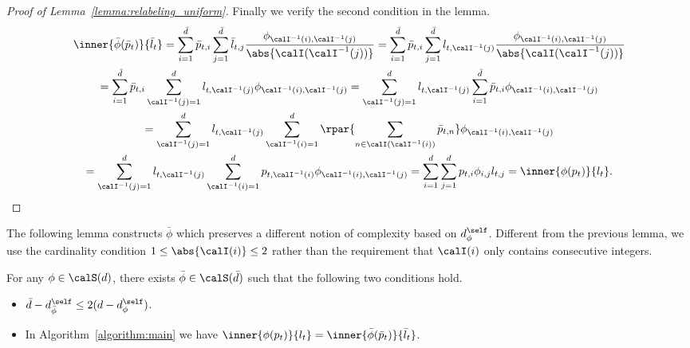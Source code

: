 \documentclass[10pt]{article}
\begin{document}
\begin{proof}[Proof of Lemma~\ref{lemma:relabeling_uniform}]
Finally we verify the second condition in the lemma. 
\begin{multline*}
\inner{\bar \phi(\bar p_t)}{\bar l_t}=\sum_{i=1}^{\bar d}\bar p_{t,i}\sum_{j=1}^{\bar d}\bar l_{t,j}\frac{\phi_{\calI^{-1}(i),\calI^{-1}(j)}}{\abs{\calI(\calI^{-1}(j))}}=\sum_{i=1}^{\bar d}\bar p_{t,i}\sum_{j=1}^{\bar d}l_{t,\calI^{-1}(j)}\frac{\phi_{\calI^{-1}(i),\calI^{-1}(j)}}{\abs{\calI(\calI^{-1}(j))}}\\
=\sum_{i=1}^{\bar d}\bar p_{t,i}\sum_{\calI^{-1}(j)=1}^{d}l_{t,\calI^{-1}(j)}\phi_{\calI^{-1}(i),\calI^{-1}(j)}=\sum_{\calI^{-1}(j)=1}^{d}l_{t,\calI^{-1}(j)}\sum_{i=1}^{\bar d}\bar p_{t,i}\phi_{\calI^{-1}(i),\calI^{-1}(j)}\\
=\sum_{\calI^{-1}(j)=1}^{d}l_{t,\calI^{-1}(j)}\sum_{\calI^{-1}(i)=1}^{d}\rpar{\sum_{n\in\calI(\calI^{-1}(i))}\bar p_{t,n}}\phi_{\calI^{-1}(i),\calI^{-1}(j)}\\
=\sum_{\calI^{-1}(j)=1}^{d}l_{t,\calI^{-1}(j)}\sum_{\calI^{-1}(i)=1}^{d}p_{t,\calI^{-1}(i)}\phi_{\calI^{-1}(i),\calI^{-1}(j)}=\sum_{i=1}^{d}\sum_{j=1}^{d}p_{t,i}\phi_{i,j}l_{t,j}=\inner{\phi(p_t)}{l_t}.\qedhere
\end{multline*}
\end{proof}

The following lemma constructs $\bar\phi$ which preserves a different notion of complexity based on $d^\self_\phi$. Different from the previous lemma, we use the cardinality condition $1\leq\abs{\calI(i)}\leq 2$ rather than the requirement that $\calI(i)$ only contains consecutive integers. 

\begin{lemma}\label{lemma:relabeling_self}
For any $\phi\in\calS(d)$, there exists $\bar\phi\in\calS(\bar d)$ such that the following two conditions hold. 
\begin{itemize}
\item $\bar d-d^\self_{\bar\phi}\leq 2(d-d^\self_\phi)$.
\item In Algorithm~\ref{algorithm:main} we have $\inner{\phi(p_t)}{l_t}=\inner{\bar \phi(\bar p_t)}{\bar l_t}$.
\end{itemize}
\end{lemma}
\end{document}
